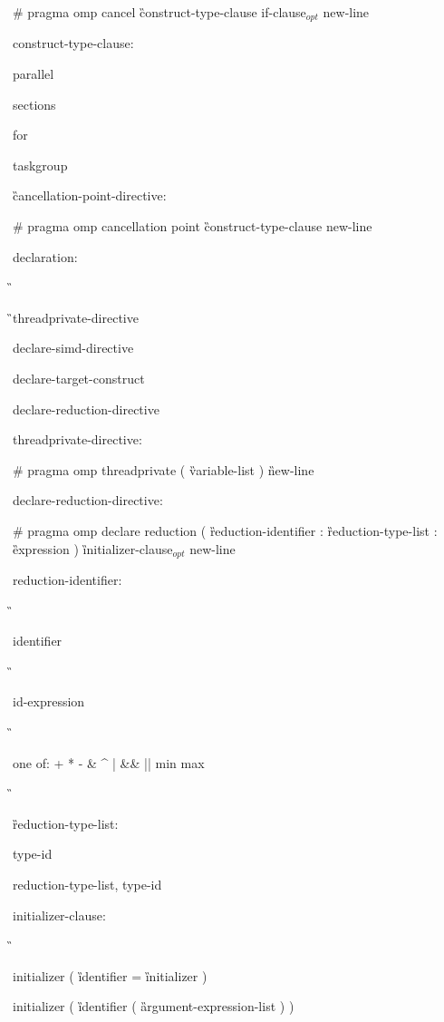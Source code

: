 {\C\I \# pragma omp cancel \G construct-type-clause if-clause$_{opt}$ new-line

construct-type-clause:

\C\I parallel

\I sections

\I for

\I taskgroup

\G cancellation-point-directive:

\C\I \# pragma omp cancellation point \G construct-type-clause new-line

declaration:

\G{}

\G\I threadprivate-directive

\I declare-simd-directive

\I declare-target-construct

\I declare-reduction-directive

threadprivate-directive:

\C\I \# pragma omp threadprivate ( \G variable-list \C ) \G new-line

declare-reduction-directive:

\C\I \# pragma omp declare reduction ( \G reduction-identifier \C : \G reduction-type-list \C : \G expression \C ) \G initializer-clause$_{opt}$ new-line

reduction-identifier: 

\G\cspecificstart

\I identifier 

\G\cspecificend

\cppspecificstart

\I id-expression 

\G\cppspecificend

\ccppspecificstart

\I one of: \C + * - \& \^ { } \C | \&\& || min max 

\G\ccppspecificend

\G reduction-type-list: 

\I type-id 

\I reduction-type-list, type-id 

\begin{samepage}
initializer-clause: 

\G\cspecificstart

\C\I initializer ( \G identifier \C = \G initializer \C )

\C\I initializer ( \G identifier \C ( \G argument-expression-list \C ) ) 


\end{samepage}}
